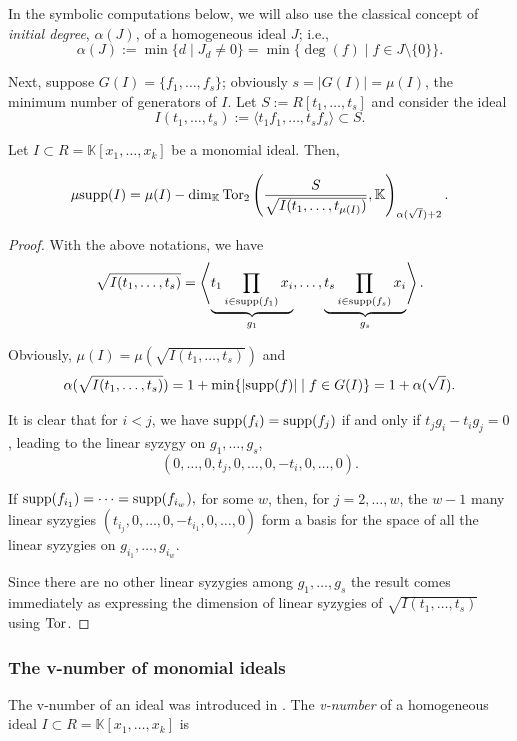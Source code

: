 \documentclass[11pt]{amsart}   %
\begin{document}
In the symbolic computations below, we will also use the classical concept of {\em initial degree}, $\alpha(J)$, of a homogeneous ideal $J$; i.e., $$\alpha(J):=\min\{d\mid J_d\neq 0\} = \min\{\deg(f)\mid f\in J\setminus\{0\}\}.$$

Next, suppose $G(I)=\{f_1,\ldots,f_s\}$; obviously $s=|G(I)|=\mu(I)$, the minimum number of generators of $I$. Let $S:=R[t_1,\ldots,t_s]$ and consider the ideal $$I(t_1,\ldots,t_s):=\langle t_1f_1,\ldots,t_sf_s\rangle\subset S.$$

\begin{prop}\label{prop_mu_support} Let $I\subset R=\mathbb K[x_1,\ldots,x_k]$ be a monomial ideal. Then,

$$\mu{\rm supp}(I)=\mu(I)-\dim_{\mathbb K}{\rm Tor}_2\left(\frac{S}{\sqrt{I(t_1,\ldots,t_{\mu(I)})}},\mathbb K\right)_{\alpha(\sqrt{I})+2}.$$    
\end{prop}
\begin{proof} With the above notations, we have $$\sqrt{I(t_1,\ldots,t_s)}=\left\langle \underbrace{t_1\prod_{i\in{\rm supp}(f_1)}x_i}_{g_1},\ldots,\underbrace{t_s\prod_{i\in{\rm supp}(f_s)}x_i}_{g_s}\right\rangle.$$

Obviously, $\mu(I)=\mu(\sqrt{I(t_1,\ldots,t_s)})$ and $$\alpha(\sqrt{I(t_1,\ldots,t_s)})=1+\min\{|{\rm supp}(f)|\mid f\in G(I)\}=1+\alpha(\sqrt{I}).$$

It is clear that for $i< j$, we have ${\rm supp}(f_i)={\rm supp}(f_j)$ if and only if $t_jg_i-t_ig_j=0$, leading to the linear syzygy on $g_1,\ldots,g_s$, $$(0,\ldots,0,t_j,0,\ldots,0,-t_i,0,\ldots,0).$$ 

If ${\rm supp}(f_{i_1})=\cdots={\rm supp}(f_{i_w}),$ for some $w$, then, for $j=2,\ldots, w$, the $w-1$ many linear syzygies $(t_{i_j},0,\ldots,0,-t_{i_1},0,\ldots,0)$ form a basis for the space of all the linear syzygies on $g_{i_1},\ldots,g_{i_w}$.

Since there are no other linear syzygies among $g_1,\ldots,g_s$ the result comes immediately as expressing the dimension of linear syzygies of $\sqrt{I(t_1,\ldots,t_s)}$ using ${\rm Tor}$.
\end{proof}

\subsubsection{The {\rm v}-number of monomial ideals} The v-number of an ideal was introduced in \cite[Definition 4.1]{CSTVV}. The {\em {\rm v}-number} of a homogeneous ideal $I\subset R=\mathbb K[x_1,\ldots,x_k]$ is
\end{document}
